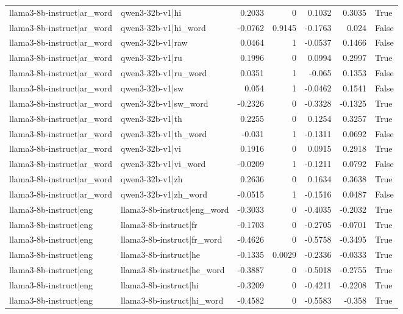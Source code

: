\begin{table}
\begin{tabular}{l l r r r r l}
llama3-8b-instruct|ar_word & qwen3-32b-v1|hi & 0.2033 & 0 & 0.1032 & 0.3035 & True \\
llama3-8b-instruct|ar_word & qwen3-32b-v1|hi_word & -0.0762 & 0.9145 & -0.1763 & 0.024 & False \\
llama3-8b-instruct|ar_word & qwen3-32b-v1|raw & 0.0464 & 1 & -0.0537 & 0.1466 & False \\
llama3-8b-instruct|ar_word & qwen3-32b-v1|ru & 0.1996 & 0 & 0.0994 & 0.2997 & True \\
llama3-8b-instruct|ar_word & qwen3-32b-v1|ru_word & 0.0351 & 1 & -0.065 & 0.1353 & False \\
llama3-8b-instruct|ar_word & qwen3-32b-v1|sw & 0.054 & 1 & -0.0462 & 0.1541 & False \\
llama3-8b-instruct|ar_word & qwen3-32b-v1|sw_word & -0.2326 & 0 & -0.3328 & -0.1325 & True \\
llama3-8b-instruct|ar_word & qwen3-32b-v1|th & 0.2255 & 0 & 0.1254 & 0.3257 & True \\
llama3-8b-instruct|ar_word & qwen3-32b-v1|th_word & -0.031 & 1 & -0.1311 & 0.0692 & False \\
llama3-8b-instruct|ar_word & qwen3-32b-v1|vi & 0.1916 & 0 & 0.0915 & 0.2918 & True \\
llama3-8b-instruct|ar_word & qwen3-32b-v1|vi_word & -0.0209 & 1 & -0.1211 & 0.0792 & False \\
llama3-8b-instruct|ar_word & qwen3-32b-v1|zh & 0.2636 & 0 & 0.1634 & 0.3638 & True \\
llama3-8b-instruct|ar_word & qwen3-32b-v1|zh_word & -0.0515 & 1 & -0.1516 & 0.0487 & False \\
llama3-8b-instruct|eng & llama3-8b-instruct|eng_word & -0.3033 & 0 & -0.4035 & -0.2032 & True \\
llama3-8b-instruct|eng & llama3-8b-instruct|fr & -0.1703 & 0 & -0.2705 & -0.0701 & True \\
llama3-8b-instruct|eng & llama3-8b-instruct|fr_word & -0.4626 & 0 & -0.5758 & -0.3495 & True \\
llama3-8b-instruct|eng & llama3-8b-instruct|he & -0.1335 & 0.0029 & -0.2336 & -0.0333 & True \\
llama3-8b-instruct|eng & llama3-8b-instruct|he_word & -0.3887 & 0 & -0.5018 & -0.2755 & True \\
llama3-8b-instruct|eng & llama3-8b-instruct|hi & -0.3209 & 0 & -0.4211 & -0.2208 & True \\
llama3-8b-instruct|eng & llama3-8b-instruct|hi_word & -0.4582 & 0 & -0.5583 & -0.358 & True \\

\end{tabular}
\end{table}
